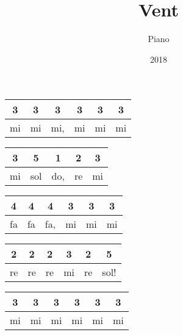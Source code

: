 \documentclass[11pt]{article}
\begin{document}
\title{Vent}
\author{Piano}
\date{2018}
\maketitle



\huge

\begin{center}
\begin{tabular}{|*{6}{c|}}
\hline
3  &  3  &  3  &  3  &  3  &  3  \\ \hline 
mi  &  mi  &  mi,  &  mi   &  mi  &  mi   \\ \hline 
\end{tabular}
\end{center}



\begin{center}
\begin{tabular}{|*{5}{c|}}
\hline
3  &  5  &  1  &  2  &  3  \\ \hline 
mi  &  sol  &  do,  &  re   &  mi   \\ \hline 
\end{tabular}
\end{center}


 

\begin{center}
\begin{tabular}{|*{6}{c|}}
\hline
4  &  4  &  4  &  3  &  3  &  3  \\ \hline 
fa  &  fa  &  fa,  &  mi   &  mi  &  mi   \\ \hline 
\end{tabular}
\end{center}



\begin{center}
\begin{tabular}{|*{6}{c|}}
\hline
2  &  2  &  2  &  3  &  2  &  5  \\ \hline 
re  &  re  &  re   &  mi   &  re  &  sol!   \\ \hline 
\end{tabular}
\end{center}





\begin{center}
\begin{tabular}{|*{6}{c|}}
\hline
3  &  3  &  3  & 3  &  3  &  3  \\ \hline 
mi  &  mi  &  mi   &  mi   &  mi  &  mi   \\ \hline 
\end{tabular}
\end{center}
\end{document}
